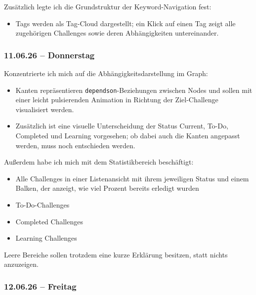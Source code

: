 Zusätzlich legte ich die Grundstruktur der Keyword-Navigation fest:

\begin{itemize}[itemsep=2pt, topsep=4pt]
  \item Tags werden als Tag-Cloud dargestellt; ein Klick auf einen Tag zeigt alle
        zugehörigen Challenges sowie deren Abhängigkeiten untereinander.
\end{itemize}

\subsubsection{11.06.26 -- Donnerstag}

Konzentrierte ich mich auf die Abhängigkeitsdarstellung im Graph:

\begin{itemize}[itemsep=2pt, topsep=4pt]
  \item Kanten repräsentieren \texttt{dependson}-Beziehungen zwischen Nodes und sollen
        mit einer leicht pulsierenden Animation in Richtung der Ziel-Challenge
        visualisiert werden.
  \item Zusätzlich ist eine visuelle Unterscheidung der Status Current, To-Do,
        Completed und Learning vorgesehen; ob dabei auch die Kanten angepasst werden,
        muss noch entschieden werden.
\end{itemize}
Außerdem habe ich mich mit dem Statistikbereich beschäftigt:

\begin{itemize}[itemsep=2pt, topsep=4pt]
  \item Alle Challenges in einer Listenansicht mit ihrem jeweiligen Status und einem
        Balken, der anzeigt, wie viel Prozent bereits erledigt wurden
  \item To-Do-Challenges
  \item Completed Challenges
  \item Learning Challenges
\end{itemize}

Leere Bereiche sollen trotzdem eine kurze Erklärung besitzen, statt nichts anzuzeigen.

\subsubsection{12.06.26 -- Freitag}


